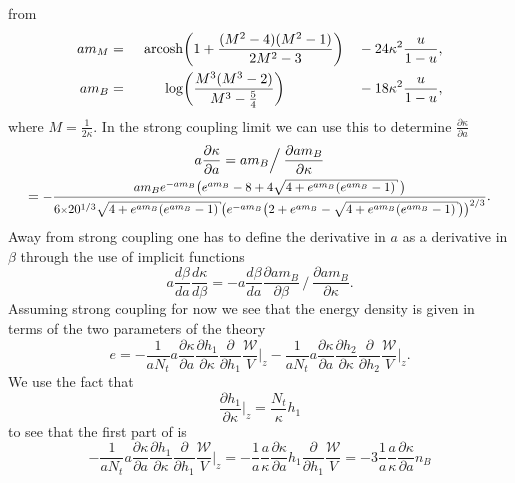 from \citep{Langelage:2014vpa}
%
\begin{alignat}{99}
  a m_M &{}={}& \,\acosh &\bigg(1 + \frac{(M^2 - 4)(M^2 - 1)}{2M^2 - 3}\bigg) &&- 24 \kappa^2 \frac{u}{1-u},\\
  a m_B &{}={}& \log &\bigg(\frac{M^3(M^3 - 2)}{M^3 - \frac{5}{4}}\bigg) &&- 18
  \kappa^2 \frac{u}{1-u},
\end{alignat}
%
where $M = \frac{1}{2 \kappa}$. In the strong coupling limit we can use this
to determine $\frac{\partial \kappa}{\partial a}$
%
\begin{multline}
  a \frac{\partial \kappa}{\partial a} = a m_B \Big/
    \:\frac{\partial a m_B}{\partial \kappa} \\
  = \scalemath{0.9}{%
    -\frac{%
        a m_B e^{-a m_B} \big( e^{a m_B} - 8 + 4 \sqrt{4 + e^{a m_B} (e^{a m_B} - 1)} \,\big)%
      }{%
        6 \scalemath{0.8}{\times} 20^{1/3} \sqrt{4 + e^{a m_B} (e^{a m_B} - 1)}
        \big(e^{-a m_B} \big( 2 + e^{a m_B} - \sqrt{4 + e^{a m_B} (e^{a m_B} - 1)} \big) \big)^{2/3}
      }}.
\end{multline}
%
Away from strong coupling one has to define the derivative in $a$ as a
derivative in $\beta$ through the use of implicit functions
%
\begin{equation}
  a \frac{d \beta}{d a} \frac{d \kappa}{d \beta} = - a \frac{d \beta}{d a}
  \frac{\partial a m_B}{\partial \beta} \,\Big/ \:
  \frac{\partial a m_B}{\partial \kappa}.
\end{equation}
%
Assuming strong coupling for now we see that the energy density is given in
terms of the two parameters of the theory
%
\begin{equation} \label{eq:energy_dens_mid_calc}
  e =  -\frac{1}{a N_t} a\frac{\partial \kappa}{\partial a}
    \frac{\partial h_1}{\partial \kappa} \frac{\partial}{\partial h_1}
    \frac{\mathcal{W}}{V} \bigg|_z
  -\frac{1}{a N_t} a\frac{\partial \kappa}{\partial a}
    \frac{\partial h_2}{\partial \kappa} \frac{\partial}{\partial h_2}
    \frac{\mathcal{W}}{V} \bigg|_z.
\end{equation}
%
We use the fact that
%
\begin{equation}
  \frac{\partial h_1}{\partial \kappa} \bigg|_z = \frac{N_t}{\kappa} h_1
\end{equation}
%
to see that the first part of  is
%
\begin{equation}
  -\frac{1}{a N_t} a\frac{\partial \kappa}{\partial a}
    \frac{\partial h_1}{\partial \kappa} \frac{\partial}{\partial h_1}
    \frac{\mathcal{W}}{V} \bigg|_z
  = - \frac{1}{a} \frac{a}{\kappa} \frac{\partial \kappa}{\partial a} h_1
  \frac{\partial}{\partial h_1} \frac{\mathcal{W}}{V}
  = -3 \frac{1}{a} \frac{a}{\kappa} \frac{\partial \kappa}{\partial a} n_B
\end{equation}
